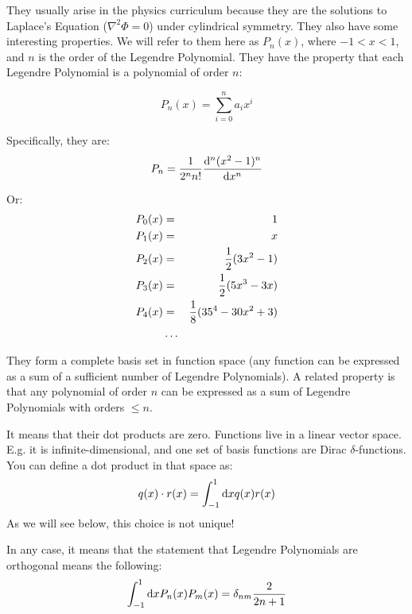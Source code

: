 \begin{answer}
  They usually arise in the physics curriculum because they are the
  solutions to Laplace's Equation ($\nabla^2 \Phi =0$) under
  cylindrical symmetry. They also have some interesting properties. We
  will refer to them here as $P_n(x)$, where $-1 < x < 1$, and $n$ is
  the order of the Legendre Polynomial. They have the property that
  each Legendre Polynomial is a polynomial of order $n$:

  \begin{equation}
    P_n(x) = \sum_{i=0}^n a_i x^i 
  \end{equation}

  Specifically, they are:
  \begin{equation}
    P_n = \frac{1}{2^n n!} \frac{{\rm d}^n(x^2 -1)^n}{{\rm d} x^n}
  \end{equation}

  Or:
  \begin{eqnarray}
    P_0(x) &=& 1 \cr
    P_1(x) &=& x \cr
    P_2(x) &=& \frac{1}{2}(3x^2 -1) \cr
    P_3(x) &=& \frac{1}{2}(5x^3 - 3x) \cr
    P_4(x) &=& \frac{1}{8}(35^4 - 30x^2 + 3) \cr
    &\ldots& 
  \end{eqnarray}

  They form a complete basis set in function space (any function can be
  expressed as a sum of a sufficient number of Legendre Polynomials).
  A related property is that any polynomial of order $n$ can be
  expressed as a sum of Legendre Polynomials with orders $\le n$.
\end{answer}


\begin{answer}
  It means that their dot products are zero. Functions live in a linear
  vector space. E.g. it is infinite-dimensional, and one set of basis
  functions are Dirac $\delta$-functions. You can define a dot product
  in that space as:
  \begin{equation}
    q(x) \cdot r(x) = \int_{-1}^{1} {\rm d}x q(x) r(x)
  \end{equation}
  As we will see below, this choice is not unique!

  In any case, it means that the statement that Legendre Polynomials
  are orthogonal means the following:
  \begin{equation}
    \int_{-1}^{1} {\rm d}x P_n(x) P_m(x) = \delta_{nm}
    \frac{2}{2n+1}
  \end{equation}
\end{answer}

